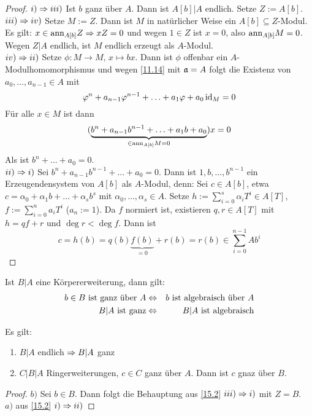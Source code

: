 \begin{proof}
	$i)\Rightarrow iii)$ Ist $b$ ganz über $A$. Dann ist $A[b]|A$ endlich. Setze $Z:= A[b]$.\\
	$iii)\Rightarrow iv)$ Setze $M:= Z$. Dann ist $M$ in natürlicher Weise ein $A[b] \subseteq Z$-Modul. Es gilt: $x\in \text{ann}_{A[b]}Z \Rightarrow xZ =0$ und wegen $1\in Z$ ist $x=0$, also $\text{ann}_{A[b]} M =0$. Wegen $Z|A$ endlich, ist $M$ endlich erzeugt als $A$-Modul.\\
	$iv)\Rightarrow ii)$ Setze $\phi:M \to M,\, x\mapsto bx$. Dann ist $\phi$ offenbar ein $A$-Modulhomomorphismus und wegen \ref{11.14} mit $\mathfrak{a} = A$ folgt die Existenz von $a_0, \ldots, a_{n-1}\in A$ mit 
	$$\varphi^n + a_{n-1}\varphi^{n-1} + \ldots + a_1 \varphi + a_0 \operatorname{id}_M= 0$$
	Für alle $x\in M$ ist dann 
	$$(\underbrace{b^n + a_{n-1} b^{n-1} + \ldots + a_1 b + a_0}_{\in \text{ann}_{A[b]}M=0})x=0$$
	Als ist $b^n + \ldots + a_0 =0$.\\
	$ii)\Rightarrow i)$ Sei $b^n + a_{n-1}b^{n-1} + \ldots + a_0=0$. Dann ist $1, b,\ldots, b^{n-1}$ ein Erzeugendensystem von $A[b]$ als $A$-Modul, denn: Sei $c\in A[b]$, etwa $c= \alpha_0 + \alpha_1 b + \ldots + \alpha_sb^s$ mit $\alpha_0, \ldots, \alpha_s\in A$. Setze $h:= \sum_{i=0}^s \alpha_i T^i\in A[T]$, $f:=\sum_{i=0}^n a_i T^i$ ($a_n:= 1$). Da $f$ normiert ist, existieren $q,r\in A[T]$ mit $h=qf+r$ und $\deg r < \deg f$. Dann ist 
	$$c=h(b) = q(b) \underbrace{f(b)}_{=0} + r(b) = r(b) \in \sum_{i=0}^{n-1} Ab^i$$
	
\end{proof}
\begin{anm}
	Ist $B|A$ eine Körpererweiterung, dann gilt:
	\begin{eqnarray*}
	b\in B \text{ ist ganz über } A & \Leftrightarrow & b\text{ ist algebraisch über } A\\
	B|A \text{ ist ganz} & \Leftrightarrow & B|A \text{ ist algebraisch}
	\end{eqnarray*}
\end{anm}
\begin{fo}\label{15.3}
	Es gilt:
	\begin{enumerate}[label= \alph*)]
		\item $B|A$ endlich $\Rightarrow B|A$ ganz
		\item $C|B|A$ Ringerweiterungen, $c\in C$ ganz über $A$. Dann ist $c$ gnaz über $B$.
	\end{enumerate}
\end{fo}
\begin{proof}
	$b)$ Sei $b\in B$. Dann folgt die Behauptung aus \ref{15.2} $iii)\Rightarrow i)$ mit $Z=B$.\\
	$a)$ aus \ref{15.2} $i)\Rightarrow ii)$
\end{proof}
